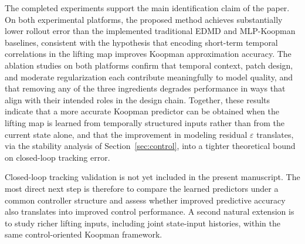 \documentclass[journal]{IEEEtran}
\begin{document}
The completed experiments support the main identification claim of the paper. On both experimental platforms, the proposed method achieves substantially lower rollout error than the implemented traditional EDMD and MLP-Koopman baselines, consistent with the hypothesis that encoding short-term temporal correlations in the lifting map improves Koopman approximation accuracy. The ablation studies on both platforms confirm that temporal context, patch design, and moderate regularization each contribute meaningfully to model quality, and that removing any of the three ingredients degrades performance in ways that align with their intended roles in the design chain. Together, these results indicate that a more accurate Koopman predictor can be obtained when the lifting map is learned from temporally structured inputs rather than from the current state alone, and that the improvement in modeling residual $\varepsilon$ translates, via the stability analysis of Section~\ref{sec:control}, into a tighter theoretical bound on closed-loop tracking error.

Closed-loop tracking validation is not yet included in the present manuscript. The most direct next step is therefore to compare the learned predictors under a common controller structure and assess whether improved predictive accuracy also translates into improved control performance. A second natural extension is to study richer lifting inputs, including joint state-input histories, within the same control-oriented Koopman framework.
\end{document}
